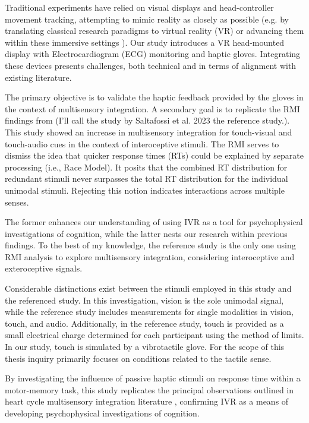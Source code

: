 \documentclass[12pt,oneside,openright]{report}
\begin{document}
Traditional experiments have relied on visual displays and head-controller movement tracking, attempting to mimic reality as closely as possible (e.g. by translating classical research paradigms to virtual reality (VR) or advancing them within these immersive settings \parencite{Kisker2024InducedOB}). Our study introduces a VR head-mounted display with Electrocardiogram (ECG) monitoring and haptic gloves. Integrating these devices presents challenges, both technical and in terms of alignment with existing literature.

The primary objective is to validate the haptic feedback provided by the gloves in the context of multisensory integration. A secondary goal is to replicate the RMI findings from \textcite{SALTAFOSSI2023108642}(I'll call the study by Saltafossi et al. 2023 the reference study.). This study showed an increase in multisensory integration for touch-visual and touch-audio cues in the context of interoceptive stimuli. The RMI serves to dismiss the idea that quicker response times (RTs) could be explained by separate processing (i.e., Race Model). It posits that the combined RT distribution for redundant stimuli never surpasses the total RT distribution for the individual unimodal stimuli. Rejecting this notion indicates interactions across multiple senses.

The former enhances our understanding of using IVR as a tool for psychophysical investigations of cognition, while the latter nests our research within previous findings. To the best of my knowledge, the reference study is the only one using RMI analysis to explore multisensory integration, considering interoceptive and exteroceptive signals.

Considerable distinctions exist between the stimuli employed in this study and the referenced study. In this investigation, vision is the sole unimodal signal, while the reference study includes measurements for single modalities in vision, touch, and audio. Additionally, in the reference study, touch is provided as a small electrical charge determined for each participant using the method of limits. In our study, touch is simulated by a vibrotactile glove. For the scope of this thesis inquiry primarily focuses on conditions related to the tactile sense.

By investigating the influence of passive haptic stimuli on response time within a motor-memory task, this study replicates the principal observations outlined in heart cycle multisensory integration literature \parencite{SALTAFOSSI2023108642}, confirming IVR as a means of developing psychophysical investigations of cognition.
\end{document}
